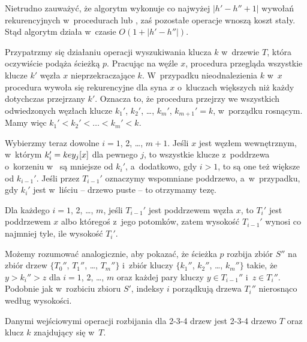 Nietrudno zauważyć, że algorytm wykonuje co najwyżej $|h'-h''+1|$ wywołań rekurencyjnych w~procedurach  lub , zaś pozostałe operacje wnoszą koszt stały.
Stąd algorytm działa w~czasie $O(1+|h'-h''|)$.

\subproblem %
Przypatrzmy się działaniu operacji wyszukiwania klucza $k$ w~drzewie $T$, która oczywiście podąża ścieżką $p$.
Pracując na węźle $x$, procedura przegląda wszystkie klucze $k'$ węzła $x$ nieprzekraczające $k$.
W~przypadku nieodnalezienia $k$ w~$x$ procedura wywoła się rekurencyjne dla syna $x$ o~kluczach większych niż każdy dotychczas przejrzany $k'$.
Oznacza to, że procedura przejrzy we wszystkich odwiedzonych węzłach klucze $k_1'$, $k_2'$, \dots, $k_m'$, $k_{m+1}'=k$, w~porządku rosnącym.
Mamy więc $k_1'<k_2'<\dots<k_m'<k$.

Wybierzmy teraz dowolne $i=1$, 2, \dots, $m+1$.
Jeśli $x$ jest węzłem wewnętrznym, w~którym $k_i'=\attribxx{x}{key_j}$ dla pewnego $j$, to wszystkie klucze z~poddrzewa o~korzeniu w~ są mniejsze od $k_i'$, a~dodatkowo, gdy $i>1$, to są one też większe od $k_{i-1}'$.
Jeśli przez $T_{i-1}'$ oznaczymy wspomniane poddrzewo, a~w~przypadku, gdy $k_i'$ jest w~liściu -- drzewo puste -- to otrzymamy tezę.

Dla każdego $i=1$, 2, \dots, $m$, jeśli $T_{i-1}'$ jest poddrzewem węzła $x$, to $T_i'$ jest poddrzewem $x$ albo któregoś z~jego potomków, zatem wysokość $T_{i-1}'$ wynosi co najmniej tyle, ile wysokość $T_i'$.

Możemy rozumować analogicznie, aby pokazać, że ścieżka $p$ rozbija zbiór $S''$ na zbiór drzew $\{T_0''$, $T_1''$, \dots, $T_m''\}$ i~zbiór kluczy $\{k_1''$, $k_2''$, \dots, $k_m''\}$ takie, że $y>k_i''>z$ dla $i=1$, 2, \dots, $m$ oraz każdej pary kluczy $y\in T_{i-1}''$ i~$z\in T_i''$.
Podobnie jak w~rozbiciu zbioru $S'$, indeksy $i$ porządkują drzewa $T_i''$ nierosnąco według wysokości.

\subproblem %
Danymi wejściowymi operacji rozbijania dla 2-3-4 drzew jest 2-3-4 drzewo $T$ oraz klucz $k$ znajdujący się w~$T$.

